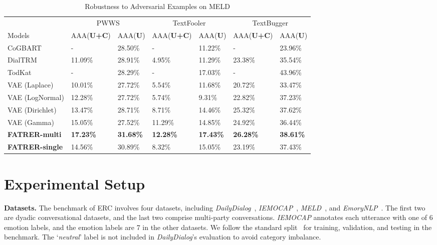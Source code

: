 \documentclass{ecai}
\begin{document}
\begin{table*}[t]
    \begin{center}
    \begin{tabular}{p{3cm}|p{1.8cm}p{1.8cm}|p{1.8cm}p{1.8cm}|p{1.8cm}p{1.8cm}}
    \toprule
         & \multicolumn{2}{c|}{PWWS} & \multicolumn{2}{c|}{TextFooler} & \multicolumn{2}{c}{TextBugger} \\
        Models & {\footnotesize AAA(\textbf{U+C})} & {\footnotesize AAA(\textbf{U}) } 
              & {\footnotesize AAA(\textbf{U+C})} & {\footnotesize AAA(\textbf{U}) }
              & {\footnotesize AAA(\textbf{U+C})} & {\footnotesize AAA(\textbf{U}) }\\ 
        \hline\hline
        CoGBART         & -       & 28.50\% &       - & 11.22\% &       - & 23.96\%\\
        DialTRM         & 11.09\% & 28.91\% &  4.95\% & 11.29\% & 23.38\% & 35.54\%\\
        TodKat          & -       & 28.29\% &       - & 17.03\% &       - & 43.96\%\\
        VAE (Laplace)   & 10.01\% & 27.72\% &  5.54\% & 11.68\% & 20.72\% & 33.47\%\\ 
        VAE (LogNormal) & 12.28\% & 27.72\% &  5.74\% &  9.31\% & 22.82\% & 37.23\%\\
        VAE (Dirichlet) & 13.47\% & 28.71\% &  8.71\% & 14.46\% & 25.32\% & 37.62\%\\
        VAE (Gamma)     & 15.05\% & 27.52\% & 11.29\% & 14.85\% & 24.92\% & 36.44\%\\
        \hline\hline
        \textbf{FATRER-multi} & \textbf{17.23\%} & \textbf{31.68\%} & \textbf{12.28\%} & \textbf{17.43\%} & \textbf{26.28\%} & \textbf{38.61\%} \\
        \textbf{FATRER-single} & 14.56\% & 30.89\% & 8.32\% & 15.05\% & 23.19\% & 37.43\% \\
    \bottomrule
    \end{tabular}
    \end{center}
    \caption{Robustness to Adversarial Examples on MELD}
    \label{tab:robustness_meld}
\end{table*}
\section{Experimental Setup}
\textbf{Datasets.} The benchmark of ERC involves four datasets, including \textit{DailyDialog}~\cite{li2017dailydialog}, \textit{IEMOCAP}~\cite{busso2008iemocap}, \textit{MELD}~\cite{poria2019meld}, and \textit{EmoryNLP}~\cite{zahiri2018emotion}. The first two are dyadic conversational datasets, and the last two comprise multi-party conversations. \textit{IEMOCAP} annotates each utterance with one of 6 emotion labels, and the emotion labels are 7 in the other datasets. We follow the standard split~\cite{zhu2021topic} for training, validation, and testing in the benchmark. The `\textit{neutral}' label is not included in \textit{DailyDialog}'s evaluation to avoid category imbalance.~\cite{ghosal2020cosmic}
\end{document}
